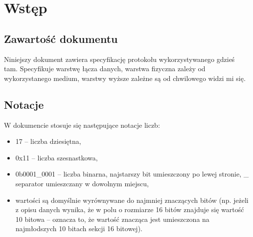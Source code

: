\section{Wstęp}
\label{Sec_Wstep}

\subsection{Zawartość dokumentu}
\label{SubSec_zawartosc}
Niniejszy dokument zawiera specyfikację protokołu \NAME wykorzystywanego gdzieś tam. Specyfikuje warstwę łącza danych, warstwa fizyczna zależy od wykorzystanego medium, warstwy wyższe zależne są od chwilowego widzi mi się.

\subsection{Notacje}
\label{SUbSec_notacje}
W dokumencie stosuje się następujące notacje liczb:
\begin{itemize}
	\item 17 -- liczba dziesiętna,
	\item 0x11 -- liczba szesnastkowa,
	\item 0b0001\_0001 -- liczba binarna, najstarszy bit umieszczony po lewej stronie, \_ separator umieszczany w dowolnym miejscu,
	\item wartości są domyślnie wyrównywane do najmniej znaczących bitów (np. jeżeli z opisu danych wynika, że w polu o rozmiarze 16 bitów znajduje się wartość 10 bitowa -- oznacza to, że wartość znacząca jest umieszczona na najmłodszych 10 bitach sekcji 16 bitowej).
\end{itemize}
